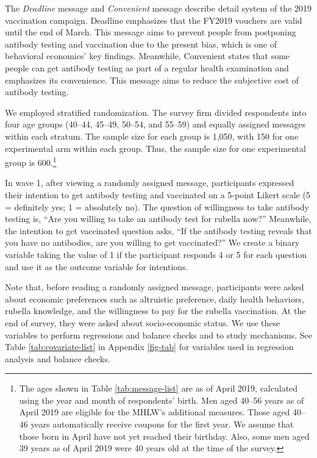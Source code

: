 \documentclass[
]{article}
\begin{document}
The \emph{Deadline} message and \emph{Convenient} message describe detail system of the 2019 vaccination campaign. Deadline emphasizes that the FY2019 vouchers are valid until the end of March. This message aims to prevent people from postponing antibody testing and vaccination due to the present bias, which is one of behavioral economics' key findings. Meanwhile, Convenient states that some people can get antibody testing as part of a regular health examination and emphasizes its convenience. This message aims to reduce the subjective cost of antibody testing.

We employed stratified randomization. The survey firm divided respondents into four age groups (40--44, 45--49, 50--54, and 55--59) and equally assigned messages within each stratum. The sample size for each group is 1,050, with 150 for one experimental arm within each group. Thus, the sample size for one experimental group is 600.\footnote{The ages shown in Table \ref{tab:message-list} are as of April 2019, calculated using the year and month of respondents' birth. Men aged 40--56 years as of April 2019 are eligible for the MHLW's additional measures. Those aged 40--46 years automatically receive coupons for the first year. We assume that those born in April have not yet reached their birthday. Also, some men aged 39 years as of April 2019 were 40 years old at the time of the survey.}

In wave 1, after viewing a randomly assigned message, participants expressed their intention to get antibody testing and vaccinated on a 5-point Likert scale (5 = definitely yes; 1 = absolutely no). The question of willingness to take antibody testing is, ``Are you willing to take an antibody test for rubella now?'' Meanwhile, the intention to get vaccinated question asks, ``If the antibody testing reveals that you have no antibodies, are you willing to get vaccinated?'' We create a binary variable taking the value of 1 if the participant responds 4 or 5 for each question and use it as the outcome variable for intentions.

Note that, before reading a randomly assigned message, participants were asked about economic preferences such as altruistic preference, daily health behaviors, rubella knowledge, and the willingness to pay for the rubella vaccination. At the end of survey, they were asked about socio-economic status. We use these variables to perform regressions and balance checks and to study mechanisms. See Table \ref{tab:covariate-list} in Appendix \ref{fig-tab} for variables used in regression analysis and balance checks.
\end{document}
